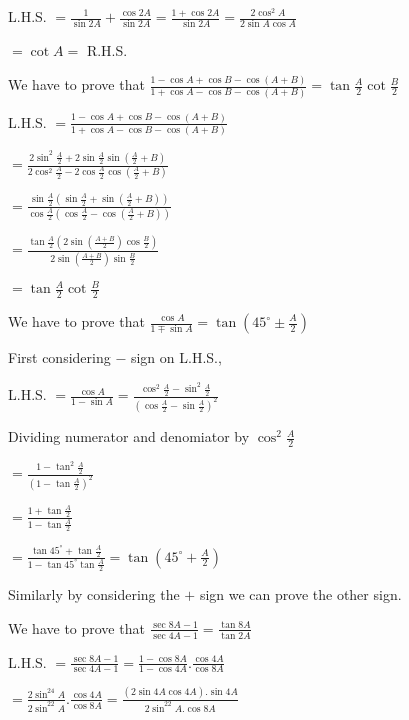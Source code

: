   L.H.S. $= \frac{1}{\sin 2A} + \frac{\cos 2A}{\sin 2A} = \frac{1 + \cos 2A}{\sin 2A} = \frac{2\cos^2A}{2\sin A\cos A}$

  $= \cot A =$ R.H.S.

\item We have to prove that $\frac{1 - \cos A + \cos B - \cos(A + B)}{1 + \cos A - \cos B - \cos(A + B)} =
  \tan\frac{A}{2}\cot\frac{B}{2}$

  L.H.S. $= \frac{1 - \cos A + \cos B - \cos(A + B)}{1 + \cos A - \cos B - \cos(A + B)}$

  $= \frac{2\sin^2\frac{A}{2} + 2\sin\frac{A}{2}\sin\left(\frac{A}{2} + B\right)}{2\cos^2\frac{A}{2} -
    2\cos\frac{A}{2}\cos\left(\frac{A}{2} + B\right)}$

  $= \frac{\sin\frac{A}{2}\left(\sin\frac{A}{2} + \sin \left(\frac{A}{2} +
    B\right)\right)}{\cos\frac{A}{2}\left(\cos\frac{A}{2} - \cos\left(\frac{A}{2} + B\right)\right)}$

  $= \frac{\tan\frac{A}{2}\left(2\sin\left(\frac{A + B}{2}\right)\cos\frac{B}{2}\right)}{2\sin\left(\frac{A +
      B}{2}\right)\sin\frac{B}{2}}$

  $= \tan\frac{A}{2}\cot\frac{B}{2}$

\item We have to prove that $\frac{\cos A}{1 \mp \sin A} = \tan\left(45^\circ \pm \frac{A}{2}\right)$

  First considering $-$ sign on L.H.S.,

  L.H.S. $= \frac{\cos A}{1 - \sin A} = \frac{\cos^2\frac{A}{2} - \sin^2\frac{A}{2}}{\left(\cos\frac{A}{2} -
    \sin\frac{A}{2}\right)^2}$

  Dividing numerator and denomiator by $\cos^2\frac{A}{2}$

  $= \frac{1 - \tan^2\frac{A}{2}}{\left(1 - \tan\frac{A}{2}\right)^2}$

  $= \frac{1 + \tan\frac{A}{2}}{1 - \tan\frac{A}{2}}$

  $= \frac{\tan45^\circ + \tan\frac{A}{2}}{1 - \tan45^\circ\tan\frac{A}{2}} = \tan\left(45^\circ + \frac{A}{2}\right)$

  Similarly by considering the $+$ sign we can prove the other sign.

\item We have to prove that $\frac{\sec 8A - 1}{\sec 4A - 1} = \frac{\tan 8A}{\tan 2A}$

  L.H.S. $= \frac{\sec 8A - 1}{\sec 4A - 1} = \frac{1 - \cos 8A}{1 - \cos 4A}.\frac{\cos4A}{\cos8A}$

  $= \frac{2\sin^24A}{2\sin^22A}.\frac{\cos 4A}{\cos8A} = \frac{(2\sin4A\cos4A).\sin4A}{2\sin^22A.\cos8A}$

